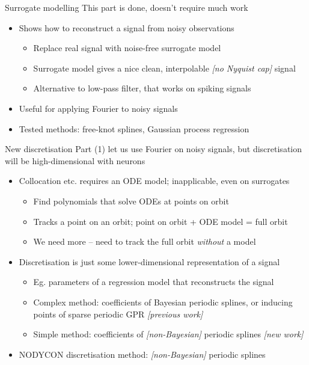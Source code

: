 \documentclass[presentation]{beamer}
\begin{document}
\begin{frame}[label={sec:org550ac8a}]{Surrogate modelling}
This part is done, doesn't require much work
\vfill
\begin{itemize}
\item Shows how to reconstruct a signal from noisy observations
\begin{itemize}
\item Replace real signal with noise-free surrogate model
\item Surrogate model gives a nice clean, interpolable \emph{[no Nyquist cap]} signal
\item Alternative to low-pass filter, that works on spiking signals
\end{itemize}
\item Useful for applying Fourier to noisy signals
\item Tested methods: free-knot splines, Gaussian process regression
\end{itemize}
\end{frame}

\begin{frame}[label={sec:org85a3f13}]{New discretisation}
Part (1) let us use Fourier on noisy signals, but discretisation will be high-dimensional with neurons
\begin{itemize}[<+->]
\item Collocation etc. requires an ODE model; inapplicable, even on surrogates
\begin{itemize}
\item Find polynomials that solve ODEs at points on orbit
\item Tracks a point on an orbit; point on orbit + ODE model = full orbit
\item We need more -- need to track the full orbit \emph{without} a model
\end{itemize}
\item Discretisation is just some lower-dimensional representation of a signal
\begin{itemize}
\item Eg. parameters of a regression model that reconstructs the signal
\item Complex method: coefficients of Bayesian periodic splines, or inducing points of sparse periodic GPR \emph{[previous work]}
\item Simple method: coefficients of \emph{[non-Bayesian]} periodic splines \emph{[new work]}
\end{itemize}
\item NODYCON discretisation method: \emph{[non-Bayesian]} periodic splines
\end{itemize}
\end{frame}
\end{document}
